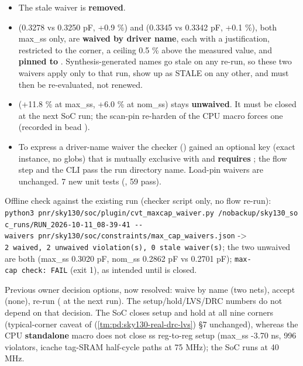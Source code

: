 \begin{record}
\begin{itemize}
\tightlist
\item
  The stale  waiver is \textbf{removed}.
\item
   (0.3278 vs 0.3250 pF, +0.9 \%) and 
  (0.3345 vs 0.3342 pF, +0.1 \%), both max\_ss only, are \textbf{waived
  by driver name}, each with a justification, restricted to the
   corner, a ceiling 0.5 \% above the measured
  value, and \textbf{pinned to }.
  Synthesis-generated names go stale on any re-run, so these two waivers
  apply only to that run, show up as STALE on any other, and must then
  be re-evaluated, not renewed.
\item
   (+11.8 \% at max\_ss, +6.0 \% at nom\_ss) stays
  \textbf{unwaived}. It must be closed at the next SoC run; the
   scan-pin re-harden of the CPU macro forces one (recorded
  in bead ).
\item
  To express a driver-name waiver the checker
  () gained an optional  key
  (exact instance, no globs) that is mutually exclusive with
   and \textbf{requires} ; the flow step and
  the CLI pass the run directory name. Load-pin waivers are unchanged. 7
  new unit tests (, 59 pass).
\end{itemize}

Offline check against the existing run (checker script only, no flow
re-run):
\texttt{python3\ pnr/\allowbreak{}sky130/\allowbreak{}soc/\allowbreak{}plugin/\allowbreak{}cvt\_\allowbreak{}maxcap\_\allowbreak{}waiver.\allowbreak{}py\ /\allowbreak{}nobackup/\allowbreak{}sky130\_\allowbreak{}soc\_\allowbreak{}runs/\allowbreak{}RUN\_\allowbreak{}2026-\allowbreak{}10-\allowbreak{}11\_\allowbreak{}08-\allowbreak{}39-\allowbreak{}41\ -\allowbreak{}-\allowbreak{}waivers\ pnr/\allowbreak{}sky130/\allowbreak{}soc/\allowbreak{}constraints/\allowbreak{}max\_\allowbreak{}cap\_\allowbreak{}waivers.\allowbreak{}json}
-\textgreater{}
\texttt{2\ waived,\allowbreak{}\ 2\ unwaived\ violation(s),\allowbreak{}\ 0\ stale\ waiver(s)};
the two unwaived are both  (max\_ss 0.3020 pF, nom\_ss
0.2862 pF vs 0.2701 pF);
\texttt{max-\allowbreak{}cap\ check:\allowbreak{}\ FAIL} (exit 1), as
intended until  is closed.

Previous owner decision options, now resolved: waive by name (two nets),
accept (none), re-run ( at the next run). The
setup/\allowbreak{}hold/\allowbreak{}LVS/\allowbreak{}DRC numbers do not
depend on that decision. The SoC closes setup and hold at all nine
corners (typical-corner caveat of
 (\cref{tm:pd:sky130-real-drc-lvs}) §7 unchanged), whereas the
CPU \textbf{standalone} macro does not close ss reg-to-reg setup
(max\_ss -3.70 ns, 996 violators, icache tag-SRAM half-cycle paths at 75
MHz); the SoC runs at 40 MHz.

\end{record}

